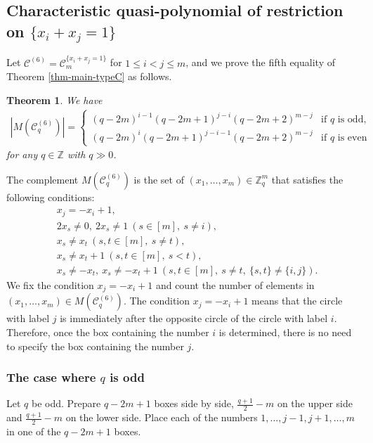 \documentclass{article}
\theoremstyle{plain}
\newtheorem{Them}{Theorem}[section]
\theoremstyle{definition}
\theoremstyle{remark}
\numberwithin{equation}{section}
\newcommand{\Cc}{\mathcal{C}}
\begin{document}
\subsection{Characteristic quasi-polynomial of restriction on $\{x_i+x_j=1\}$}\label{sec-TypeC-rest-xi=-xj+1}
Let $\Cc^{(6)}=\mathcal{C}_m^{\{x_i+x_j=1\}}$ for $1\leq i<j \leq m$, and we prove the fifth equality of Theorem \ref{thm-main-typeC} as follows.
\begin{Them}\label{thm-char-quasi-TypeC-xi=-xj+1}
We have
\begin{align*}
\left|M(\Cc_q^{(6)})\right|=
\begin{cases}
(q-2m)^{i-1}(q-2m+1)^{j-i}(q-2m+2)^{m-j}&\text{if $q$ is odd},\\
(q-2m)^{i}(q-2m+1)^{j-i-1}(q-2m+2)^{m-j}&\text{if $q$ is even}
\end{cases} 
\end{align*}
for any $q\in\mathbb{Z}$ with $q\gg 0$.
\end{Them}
The complement $M(\Cc^{(6)}_q)$ is the set of $(x_1,\dots,x_m)\in\mathbb{Z}_q^m$ that satisfies the following conditions:
\begin{align*}
&x_j=-x_i+1,\\
&2x_s\neq 0,\ 2x_s\neq 1\ (s\in [m],\ s\neq i),\\
&x_s\neq x_t\ (s,t\in [m],\ s\neq t),\\
&x_s\neq x_t+1\ (s,t\in [m],\ s<t),\\
&x_s\neq -x_t,\ x_s\neq -x_t+1\ (s,t\in [m],\ s\neq t,\ \{s,t\}\neq \{i,j\}).
\end{align*}
We fix the condition $x_j=-x_i+1$ and count the number of elements in $(x_1,\dots,x_m)\in M(\Cc^{(6)}_q)$. %
The condition $x_j=-x_i+1$ means that the circle with label $j$ is immediately after the opposite circle of the circle with label $i$.
Therefore, once the box containing the number $i$ is determined, there is no need to specify the box containing the number $j$.

\subsubsection{The case where $q$ is odd}\label{sec-TypeC-rest-x_i=-x_j+1-odd}
Let $q$ be odd.
Prepare $q-2m+1$ boxes side by side, $\displaystyle \frac{q+1}{2}-m$ on the upper side and $\displaystyle \frac{q+1}{2}-m$ on the lower side.
Place each of the numbers $1,\dots,j-1,j+1,\dots,m$ in one of the $q-2m+1$ boxes.
\end{document}
